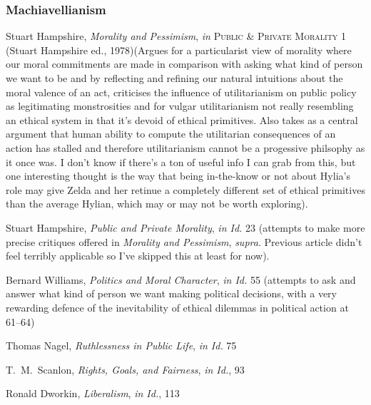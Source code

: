\documentclass[../FGP.tex]{subfiles}
\begin{document}
\subsubsection{Machiavellianism}
\begin{annotated-bibliography}
\item Stuart Hampshire, \textit{Morality and Pessimism}, \textit{in} \textsc{Public \& Private Morality} 1 (Stuart Hampshire ed., 1978)(Argues for a particularist view of morality where our moral commitments are made in comparison with asking what kind of person we want to be and by reflecting and refining our natural intuitions about the moral valence of an act, criticises the influence of utilitarianism on public policy as legitimating monstrosities and for vulgar utilitarianism not really resembling an ethical system in that it's devoid of ethical primitives. Also takes as a central argument that human ability to compute the utilitarian consequences of an action has stalled and therefore utilitarianism cannot be a progessive philsophy as it once was. I don't know if there's a ton of useful info I can grab from this, but one interesting thought is the way that being in-the-know or not about Hylia's role may give Zelda and her retinue a completely different set of ethical primitives than the average Hylian, which may or may not be worth exploring).

\item Stuart Hampshire, \textit{Public and Private Morality}, \textit{in Id.} 23 (attempts to make more precise critiques offered in \textit{Morality and Pessimism}, \textit{supra}. Previous article didn't feel terribly applicable so I've skipped this at least for now). 

\item Bernard Williams, \textit{Politics and Moral Character}, \textit{in Id.} 55 (attempts to ask and answer what kind of person we want making political decisions, with a very rewarding defence of the inevitability of ethical dilemmas in political action at 61--64)

\item Thomas Nagel, \textit{Ruthlessness in Public Life}, \textit{in Id.} 75 

\item T.~M.~Scanlon, \textit{Rights, Goals, and Fairness}, \textit{in Id.}, 93

\item Ronald Dworkin, \textit{Liberalism}, \textit{in Id.}, 113
\end{annotated-bibliography}
\end{document}
